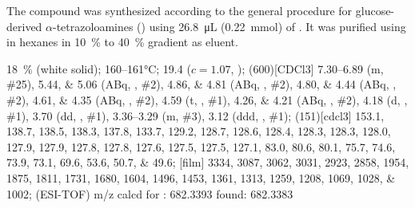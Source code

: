The compound was synthesized according to the general procedure for glucose-derived $\alpha$-tetrazoloamines () using \SI{26.8}{\micro\liter} (\SI{0.22}{\milli\mol}) of .
It was purified using  in hexanes in \SI{10}{\percent} to \SI{40}{\percent} gradient as eluent.
\begin{fullexp}
	 \SI{18}{\percent} (white solid); 
	 \numrange{160}{161}\si{\celsius}; 
	\data{[$\alpha^{23}_D$]~$=$} \num{19.4} ($c = 1.07$, ); 
	\NMR(600)[CDCl3] \numrange{7.30}{6.89} (m, \#{25}), \numlist{5.44;5.06} (ABq, , \#{2}), \numlist{4.86;4.81} (ABq, , \#{2}), \numlist{4.80;4.44} (ABq, , \#{2}), \numlist{4.61;4.35} (ABq, , \#{2}), \num{4.59} (t, , \#{1}), \numlist{4.26;4.21} (ABq, , \#{2}), \num{4.18} (d, , \#{1}), \num{3.70} (dd, , \#{1}), \numrange{3.36}{3.29} (m, \#{3}), \num{3.12} (ddd, , \#{1}); 
	(151)[cdcl3] \numlist{153.1; 138.7; 138.5; 138.3; 137.8; 133.7; 129.2; 128.7; 128.6; 128.4; 128.3; 128.3; 128.0; 127.9; 127.9; 127.8; 127.8; 127.6; 127.5; 127.5; 127.1; 83.0; 80.6; 80.1; 75.7; 74.6; 73.9; 73.1; 69.6; 53.6; 50.7; 49.6}; 
	[film] \numlist{3334; 3087; 3062; 3031; 2923; 2858; 1954; 1875; 1811; 1731; 1680; 1604; 1496; 1453; 1361; 1313; 1259; 1208; 1069; 1028; 1002}; 
	 (ESI-TOF) m/z calcd for : \num{682.3393} found: \num{682.3383}
\end{fullexp}

